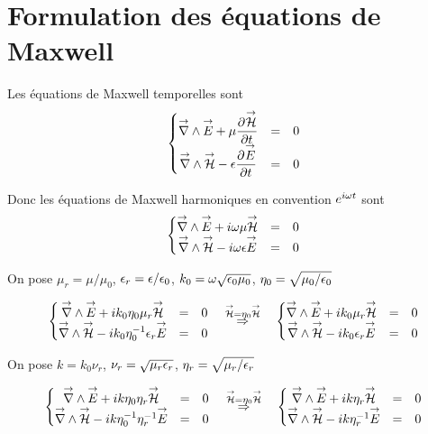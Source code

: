 \section{Formulation des équations de Maxwell}
\label{sec:annex:maxwell_equation}

Les équations de Maxwell temporelles sont
\begin{equation}
  \left\lbrace \begin{matrix}
  \vrot \vE + \mu \ddr{t}{\vH} &=& 0 \\
  \vrot \vH - \eps \ddr{t}{\vE} &=& 0 \\
  \end{matrix} \right.
\end{equation}

Donc les équations de Maxwell harmoniques en convention \(e^{i\w t}\) sont
\begin{equation}
  \left\lbrace \begin{matrix}
  \vrot \vE + i\w\mu \vH &=& 0 \\
  \vrot \vH - i\w\eps \vE &=& 0 \\
  \end{matrix} \right.
\end{equation}

On pose \(\mu_r = \mu \slash \mu_0\), \(\eps_r = \eps \slash \eps_0\), \(k_0 = \w \sqrt {\eps_0\mu_0}\), \(\eta_0=\sqrt {\mu_0/\eps_0}\)

\begin{equation}
\left\lbrace \begin{matrix}
\vrot \vE + ik_0\eta_0\mu_r \vH &=& 0 \\
\vrot \vH - ik_0\eta_0^{-1}\eps_r \vE &=& 0 \\
\end{matrix} \right.
\quad
\overset{\mathcal{\vH} = \eta_0 \vH}{\Rightarrow}
\quad
\left\lbrace \begin{matrix}
\vrot \vE + ik_0\mu_r \mathcal{\vH} &=& 0 \\
\vrot \mathcal{\vH} - ik_0\eps_r \vE &=& 0 \\
\end{matrix} \right.
\end{equation}

On pose \(k=k_0\nu_r\), \(\nu_r = \sqrt{\mu_r\eps_r}\), \(\eta_r = \sqrt{\mu_r \slash \eps_r}\)

\begin{equation}
\left\lbrace \begin{matrix}
\vrot \vE + ik\eta_0\eta_r \vH &=& 0 \\
\vrot \vH - ik\eta_0^{-1}\eta_r^{-1} \vE &=& 0 \\
\end{matrix} \right.
\quad
\overset{\mathcal{\vH} = \eta_0 \vH}{\Rightarrow}
\quad
\left\lbrace \begin{matrix}
\vrot \vE + ik\eta_r \mathcal{\vH} &=& 0 \\
\vrot \mathcal{\vH} - ik\eta_r^{-1} \vE &=& 0 \\
\end{matrix} \right.
\end{equation}